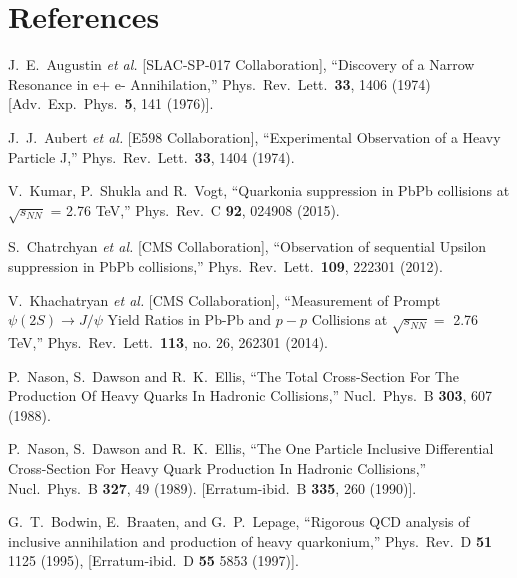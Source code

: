 \documentclass[12pt,a4paper,final]{iopart}
\begin{document}
\section*{References}
\begin{thebibliography}{100}

  J.~E.~Augustin {\it et al.} [SLAC-SP-017 Collaboration],
  ``Discovery of a Narrow Resonance in e+ e- Annihilation,''
  Phys.\ Rev.\ Lett.\  {\bf 33}, 1406 (1974)
  [Adv.\ Exp.\ Phys.\  {\bf 5}, 141 (1976)].

  J.~J.~Aubert {\it et al.} [E598 Collaboration],
  ``Experimental Observation of a Heavy Particle J,''
  Phys.\ Rev.\ Lett.\  {\bf 33}, 1404 (1974).
  

  V.~Kumar, P.~Shukla and R.~Vogt,
  ``Quarkonia suppression in PbPb collisions at $\sqrt{s_{NN}}$ = 2.76 TeV,''
  Phys.\ Rev.\ C {\bf 92}, 024908 (2015).


  S.~Chatrchyan {\it et al.} [CMS Collaboration],
  ``Observation of sequential Upsilon suppression in PbPb collisions,''
  Phys.\ Rev.\ Lett.\  {\bf 109}, 222301 (2012).


  V.~Khachatryan {\it et al.} [CMS Collaboration],
  ``Measurement of Prompt $\psi(2S) \to J/\psi$ Yield Ratios in Pb-Pb and $p-p$ Collisions at $\sqrt {s_{NN}}=$ 2.76  TeV,''
  Phys.\ Rev.\ Lett.\  {\bf 113}, no. 26, 262301 (2014).


  P.~Nason, S.~Dawson and R.~K.~Ellis,
  ``The Total Cross-Section For The Production Of Heavy Quarks In Hadronic Collisions,''
  Nucl.\ Phys.\ B {\bf 303}, 607 (1988).
  
  P.~Nason, S.~Dawson and R.~K.~Ellis,
  ``The One Particle Inclusive Differential Cross-Section For Heavy Quark Production In Hadronic Collisions,''
  Nucl.\ Phys.\ B {\bf 327}, 49 (1989).
  [Erratum-ibid.\ B {\bf 335}, 260 (1990)].

G.~T.~Bodwin, E.~Braaten, and G.~P.~Lepage,
``Rigorous QCD analysis of inclusive annihilation and production of heavy
quarkonium,''
Phys.\ Rev.\ D {\bf 51} 1125 (1995), 
[Erratum-ibid.\ D {\bf 55} 5853 (1997)].




\end{thebibliography}
\end{document}
